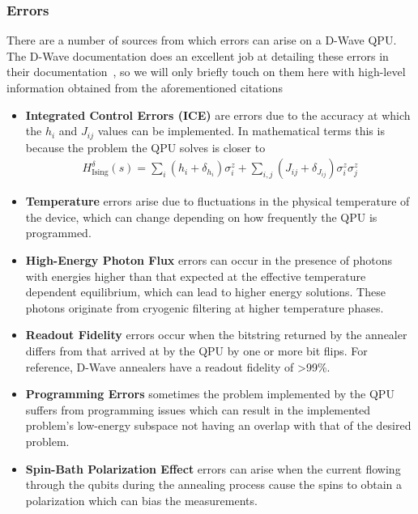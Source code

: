 \subsubsection{Errors}
There are a number of sources from which errors can arise on a D-Wave QPU.
The D-Wave documentation does an excellent job at detailing these errors in their documentation~\cite{dwave_ice_errors,dwave_other_errors}, so we will only briefly touch on them here with high-level information obtained from the aforementioned citations
\begin{itemize}
    \item \textbf{Integrated Control Errors (ICE)} are errors due to the accuracy at which the \( h_i \) and \( J_{ij} \) values can be implemented.
        In mathematical terms this is because the problem the QPU solves is closer to
        \begin{align}
            H_{\text{Ising}}^\delta(s) = \sum_i (h_i + \delta_{h_i}) \sigma_i^z + \sum_{i,j} (J_{ij} + \delta_{J_{ij}}) \sigma_i^z \sigma_j^z
        \end{align}
    \item \textbf{Temperature} errors arise due to fluctuations in the physical temperature of the device, which can change depending on how frequently the QPU is programmed.
    \item \textbf{High-Energy Photon Flux} errors can occur in the presence of photons with energies higher than that expected at the effective temperature dependent equilibrium, which can lead to higher energy solutions. These photons originate from cryogenic filtering at higher temperature phases.
    \item \textbf{Readout Fidelity} errors occur when the bitstring returned by the annealer differs from that arrived at by the QPU by one or more bit flips.
        For reference, D-Wave annealers have a readout fidelity of >99\%.
    \item \textbf{Programming Errors} sometimes the problem implemented by the QPU suffers from programming issues which can result in the implemented problem's low-energy subspace not having an overlap with that of the desired problem.
    \item \textbf{Spin-Bath Polarization Effect} errors can arise when the current flowing through the qubits during the annealing process cause the spins to obtain a polarization which can bias the measurements.
\end{itemize}
